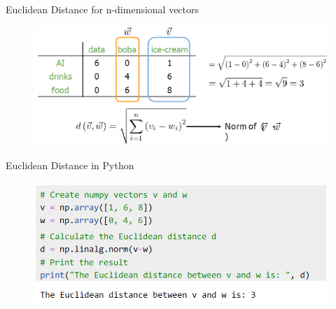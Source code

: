 \begin{frame}[allowframebreaks]{Euclidean Distance for n-dimensional vectors} 
    \begin{figure}
        \centering
        \includegraphics[width=\textwidth,height=0.65\textheight,keepaspectratio]{images/vector-space/euclidean-distance-3.png}
    \end{figure}
\end{frame}

\begin{frame}[allowframebreaks]{Euclidean Distance in Python} 
    \begin{figure}
        \centering
        \includegraphics[width=\textwidth,height=0.65\textheight,keepaspectratio]{images/vector-space/euclidean-distance-4.png}
    \end{figure}
\end{frame}

